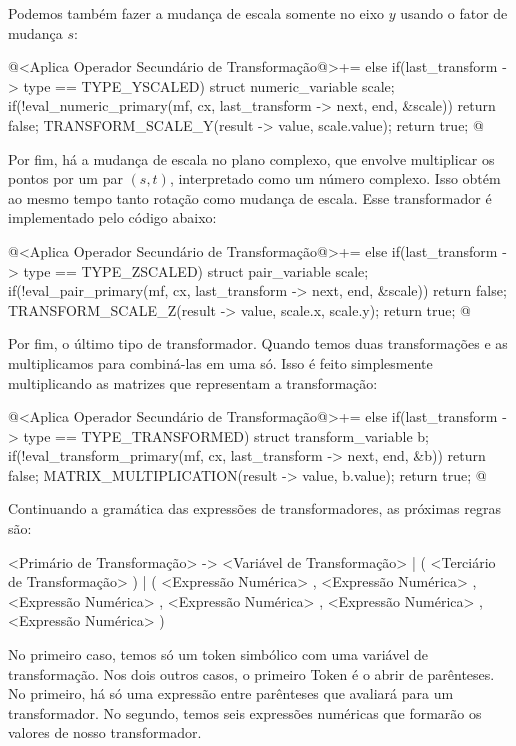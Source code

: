 Podemos também fazer a mudança de escala somente no eixo $y$ usando o
fator de mudança $s$:

\iniciocodigo
@<Aplica Operador Secundário de Transformação@>+=
else if(last_transform -> type == TYPE_YSCALED){
  struct numeric_variable scale;
  if(!eval_numeric_primary(mf, cx, last_transform -> next, end, &scale))
    return false;
  TRANSFORM_SCALE_Y(result -> value, scale.value);
  return true;
}
@
\fimcodigo

Por fim, há a mudança de escala no plano complexo, que envolve
multiplicar os pontos por um par $(s, t)$, interpretado como um número
complexo. Isso obtém ao mesmo tempo tanto rotação como mudança de
escala. Esse transformador é implementado pelo código abaixo:

\iniciocodigo
@<Aplica Operador Secundário de Transformação@>+=
else if(last_transform -> type == TYPE_ZSCALED){
  struct pair_variable scale;
  if(!eval_pair_primary(mf, cx, last_transform -> next, end, &scale))
    return false;
  TRANSFORM_SCALE_Z(result -> value, scale.x, scale.y);
  return true;
}
@
\fimcodigo

Por fim, o último tipo de transformador. Quando temos duas
transformações e as multiplicamos para combiná-las em uma só. Isso é
feito simplesmente multiplicando as matrizes que representam a
transformação:

\iniciocodigo
@<Aplica Operador Secundário de Transformação@>+=
else if(last_transform -> type == TYPE_TRANSFORMED){
  struct transform_variable b;
  if(!eval_transform_primary(mf, cx, last_transform -> next, end, &b))
    return false;
  MATRIX_MULTIPLICATION(result -> value, b.value);
  return true;
}
@
\fimcodigo


Continuando a gramática das expressões de transformadores, as próximas
regras são:

\alinhaverbatim
<Primário de Transformação> -> <Variável de Transformação> |
                               ( <Terciário de Transformação> ) |
                               ( <Expressão Numérica> , <Expressão Numérica> ,
                                 <Expressão Numérica> , <Expressão Numérica> ,
                                 <Expressão Numérica> , <Expressão Numérica> )
\alinhanormal

No primeiro caso, temos só um token simbólico com uma variável de
transformação. Nos dois outros casos, o primeiro Token é o abrir de
parênteses. No primeiro, há só uma expressão entre parênteses que
avaliará para um transformador. No segundo, temos seis expressões
numéricas que formarão os valores de nosso transformador.

